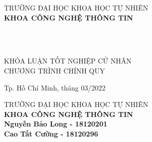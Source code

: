 \begin{titlepage}

    \begin{center}
    TRƯỜNG ĐẠI HỌC KHOA HỌC TỰ NHIÊN\\
    \textbf{KHOA CÔNG NGHỆ THÔNG TIN}\\[2cm]


    { \Large \bfseries \tenSV\\[2cm] } 


    { \Large \bfseries \tenKL\\[3cm]} 


    \large KHÓA LUẬN TỐT NGHIỆP CỬ NHÂN\\
    \large CHƯƠNG TRÌNH CHÍNH QUY\\



    \vfill
    Tp. Hồ Chí Minh, tháng 03/2022

    \end{center}

    \pagebreak

    \begin{center}

    TRƯỜNG ĐẠI HỌC KHOA HỌC TỰ NHIÊN\\
    \textbf{KHOA CÔNG NGHỆ THÔNG TIN}\\[2cm]

    {\large \bfseries Nguyễn Bảo Long - 18120201\\} 
    {\large \bfseries Cao Tất Cường - 18120296\\[2cm]}

    { \Large \bfseries \tenKL\\[3cm]} 



\end{center}
\end{titlepage}
